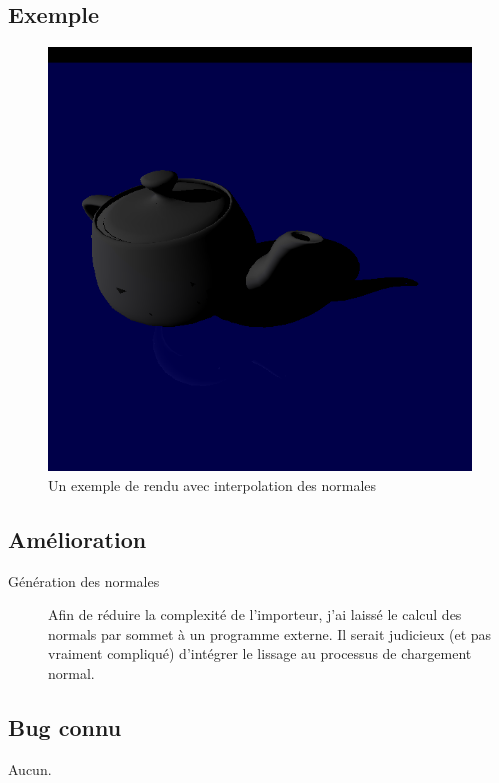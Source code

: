 \subsection{Exemple}
\begin{figure}[h]
  \includegraphics[width=\textwidth, keepaspectratio=true]{../../diary/16.png}
  \caption{Un exemple de rendu avec interpolation des normales\label{fig:smoothnormal}}
\end{figure}

\subsection{Amélioration}
\begin{description}
  \item [Génération des normales] Afin de réduire la complexité de
    l'importeur, j'ai laissé le calcul des normals par sommet à un programme
    externe. Il serait judicieux (et pas vraiment compliqué) d'intégrer le
    lissage au processus de chargement normal.
\end{description}

\subsection{Bug connu}
Aucun.
